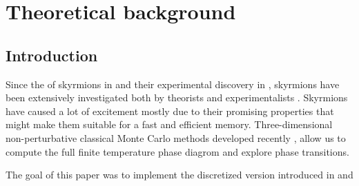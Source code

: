 %
\chapter{Theoretical background}
%
\section{Introduction}
%
Since the  of skyrmions in 
 and their experimental discovery in  ,
skyrmions have been extensively investigated both by theorists and
experimentalists . Skyrmions have caused a lot of excitement
mostly due to their promising properties that might make them suitable for a
fast and efficient memory. Three-dimensional non-perturbative
classical Monte Carlo methods developed recently , allow
us to compute the full finite temperature phase diagrom and explore phase
transitions.

The goal of this paper was to implement the discretized version introduced in  and 
